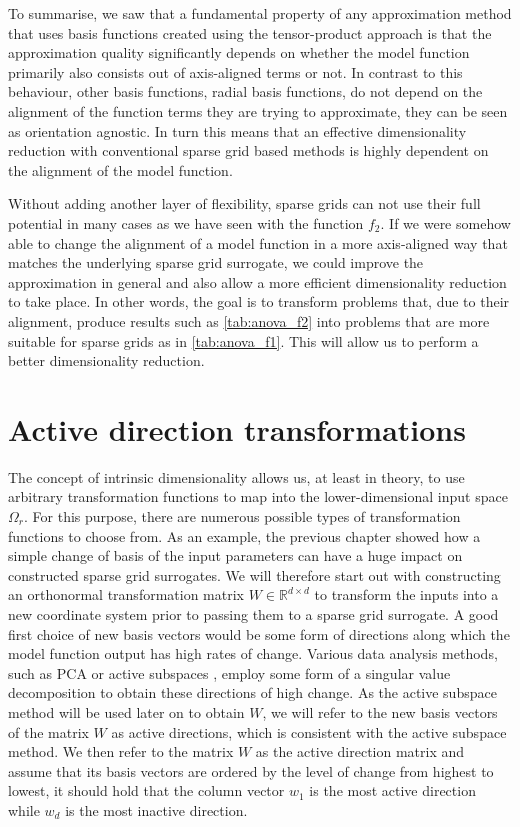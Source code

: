 \documentclass[
  a4paper,  %
  twoside,  %
  bibliography=totoc,
  headsepline,
  cleardoublepage=empty,
  parskip=half,
  draft=false
]{scrbook}
\begin{document}
To summarise, we saw that a fundamental property of any approximation method that uses basis functions created using the tensor-product approach is that the approximation quality significantly depends on whether the model function primarily also consists out of axis-aligned terms or not.
In contrast to this behaviour, other basis functions, \eg radial basis functions, do not depend on the alignment of the function terms they are trying to approximate, \ie they can be seen as orientation agnostic.
In turn this means that an effective dimensionality reduction with conventional sparse grid based methods is highly dependent on the alignment of the model function.

Without adding another layer of flexibility, sparse grids can not use their full potential in many cases as we have seen with the function $f_2$.
If we were somehow able to change the alignment of a model function in a more axis-aligned way that matches the underlying sparse grid surrogate, we could improve the approximation in general and also allow a more efficient dimensionality reduction to take place.
In other words, the goal is to transform problems that, due to their alignment, produce results such as \cref{tab:anova_f2} into problems that are more suitable for sparse grids as in \cref{tab:anova_f1}.
This will allow us to perform a better dimensionality reduction.

\section{Active direction transformations}

The concept of intrinsic dimensionality allows us, at least in theory, to use arbitrary transformation functions to map into the lower-dimensional input space $\Omega_r$.
For this purpose, there are numerous possible types of transformation functions to choose from.
As an example, the previous chapter showed how a simple change of basis of the input parameters can have a huge impact on constructed sparse grid surrogates.
We will therefore start out with constructing an orthonormal transformation matrix $W \in \mathds{R}^{d \times d}$ to transform the inputs into a new coordinate system prior to passing them to a sparse grid surrogate.
A good first choice of new basis vectors would be some form of directions along which the model function output has high rates of change.
Various data analysis methods, such as PCA \cite{Abdi2010} or active subspaces \cite{Constantine2015}, employ some form of a singular value decomposition to obtain these directions of high change.
As the active subspace method will be used later on to obtain $W$, we will refer to the new basis vectors of the matrix $W$ as active directions, which is consistent with the active subspace method.
We then refer to the matrix $W$ as the active direction matrix and assume that its basis vectors are ordered by the level of change from highest to lowest, \ie it should hold that the column vector $w_1$ is the most active direction while $w_d$ is the most inactive direction.
\end{document}
